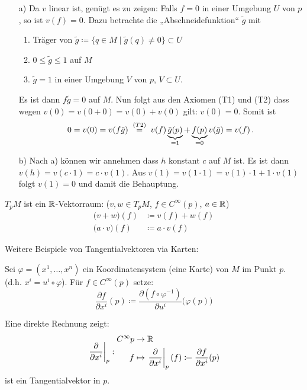 \documentclass[a4paper,twoside,DIV15,BCOR12mm]{scrbook}
\renewcommand{\da}{\coloneqq}
\begin{document}
\begin{beweis}
\begin{itemize}
\item[a)] Da $v$ linear ist, genügt es zu zeigen: Falls $f=0$ in einer Umgebung $U$ von $p$, so ist $v(f)=0$. Dazu betrachte die „Abschneidefunktion“ $\tilde g$ mit 
\begin{enumerate}
\item Träger von $\tilde g \da \{ q\in M \mid \tilde g(q) \ne 0\} \subset U$
\item $0\le \tilde g \le 1$ auf $M$
\item $\tilde g = 1$ in einer Umgebung $V$ von $p$, $V \subset U$.
\end{enumerate}
Es ist dann $f\tilde g = 0$ auf $M$. Nun folgt aus den Axiomen (T1) und (T2) dass wegen $v(0)= v(0+0) = v(0) + v(0)$ gilt: $v(0)=0$. Somit ist
\[
0 = v(0) = v(f\tilde g) \gleichwegen{(T2)} v(f)\underbrace{\tilde g(p)}_{=1} + \underbrace{f(p)}_{=0}v(\tilde g) = v(f)\,.
\]
\item[b)] Nach a) können wir annehmen dass $h$ konstant $c$ auf $M$ ist. Es ist dann $v(h)= v(c\cdot1) = c\cdot v(1)$. Aus $v(1) = v(1\cdot 1) = v(1)\cdot 1 + 1\cdot v(1)$ folgt $v(1)=0$ und damit die Behauptung.
\end{itemize}
\end{beweis}

$T_pM$ ist ein $\mathbb{R}$-Vektorraum: ($v,w \in T_pM$, $f\in C^\infty(p)$, $a\in\mathbb{R}$)
\begin{align*}
\bigl(v + w\bigr)(f) &\da v(f) + w(f) \\
\bigl(a\cdot v\bigr)(f)   &\da a\cdot v(f) 
\end{align*}


Weitere Beispiele von Tangentialvektoren via Karten:
\newcommand{\ptv}[1]{\left.\frac{\partial}{\partial x^{#1}}\right|_p}
\newcommand{\qtv}[1]{\left.\frac{\partial}{\partial x^{#1}}\right|_q}

Sei $\varphi=(x^1,\ldots,x^n)$ ein Koordinatensystem (eine Karte) von $M$ im Punkt $p$. (d.h. $x^i=u^i\circ\varphi$). Für $f\in C^{\infty}(p)$ setze:
\[
\frac{\partial f}{\partial x^i}(p) \da \frac{\partial (f\circ \varphi^{-1})}{\partial u^i}\bigl(\varphi(p)\bigr) %
\]

Eine direkte Rechnung zeigt:
\[
\ptv{i}:
\begin{aligned}
C^\infty{p} &\to \MdR \\
f &\mapsto \ptv{i}(f) \da \frac{\partial f}{\partial x^i}(p)
\end{aligned}
\]
ist ein Tangentialvektor in $p$.
\end{document}

